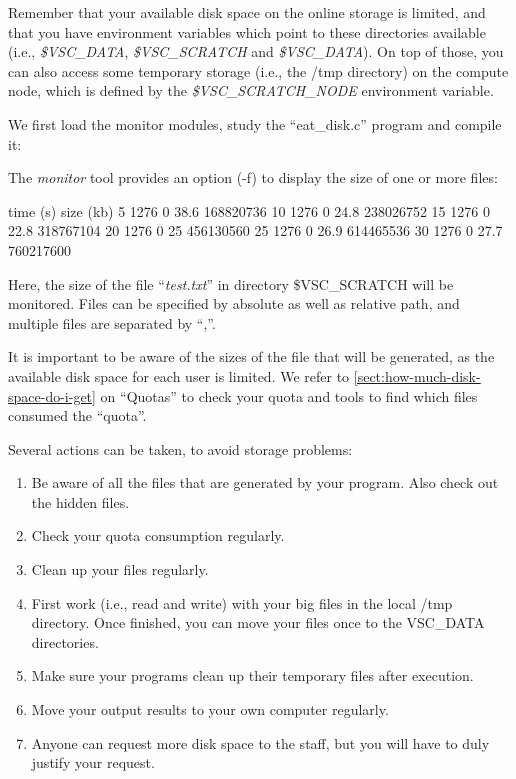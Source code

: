 Remember that your available disk space on the \hpc online storage is limited,
and that you have environment variables which point to these directories available
(i.e., \emph{\$VSC\_DATA}, \emph{\$VSC\_SCRATCH} and \emph{\$VSC\_DATA}).
On top of those, you can also access some temporary storage (i.e., the /tmp
directory) on the compute node, which is defined by the
\emph{\$VSC\_SCRATCH\_NODE} environment variable.

\ifgent
\else
  We first load the monitor modules, study the ``eat\_disk.c'' program and
  compile it:

\begin{prompt}
\end{prompt}

  The \emph{monitor} tool provides an option (-f) to display the size of one or
  more files:

\begin{prompt}
time (s) size (kb) %
5  1276  0 38.6 168820736
10  1276  0 24.8 238026752
15  1276  0 22.8 318767104
20  1276  0 25 456130560
25  1276  0 26.9 614465536
30  1276  0 27.7 760217600
\end{prompt}

  Here, the size of the file ``\emph{test.txt}'' in directory \$VSC\_SCRATCH will
  be monitored. Files can be specified by absolute as well as relative path, and
  multiple files are separated by ``,''.
\fi

It is important to be aware of the sizes of the file that will be generated, as
the available disk space for each user is limited.  We refer to \autoref{sect:how-much-disk-space-do-i-get} on
``Quotas'' to check your quota and tools to find which files consumed the
``quota''.

Several actions can be taken, to avoid storage problems:

\begin{enumerate}
\item  Be aware of all the files that are generated by your program. Also check out the hidden files.
\item  Check your quota consumption regularly.
\item  Clean up your files regularly.
\item  First work (i.e., read and write) with your big files in the local /tmp directory. Once finished, you can move your files once to the VSC\_DATA directories.
\item  Make sure your programs clean up their temporary files after execution.
\item  Move your output results to your own computer regularly.
\item  Anyone can request more disk space to the \hpc staff, but you will have to duly justify your request.
\end{enumerate}


